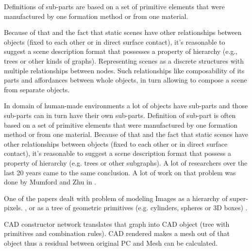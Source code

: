 Definitions of sub-parts are based on a set of primitive elements that were manufactured by one formation method or from one material.

Because of that and the fact that static scenes have other relationships between objects (fixed to each other or in direct surface contact), it's reasonable to suggest a scene description format that possesses a property of hierarchy (e.g., trees or other kinds of graphs).
Representing scenes as a discrete structures with multiple relationships between nodes. Such relationships like composability of its parts and affordances between whole objects, in turn allowing to compose a scene from separate objects.


In domain of human-made environments a lot of objects have sub-parts and those sub-parts can in turn have their own sub-parts. Definition of sub-part is often based on a set of primitive elements that were manufactured by one formation method or from one material. Because of that and the fact that static scenes have other relationships between objects (fixed to each other or in direct surface contact), it's reasonable to suggest a scene description format that possess a property of hierarchy (e.g. trees or other subgraphs).
A lot of researchers over the last 20 years came to the same conclusion. A lot of work on that problem was done by Mumford and Zhu in \cite{zhu2006stochastic}.

One of the papers dealt with problem of modeling Images as a hierarchy of super-pixels. \cite{russell2009associative}, or as a tree of geometric primitives (e.g. cylinders, spheres or 3D boxes) \cite{li2017grass}.




CAD constructor network translates that graph into CAD object (tree with primitives and combination rules). CAD rendered makes a mesh out of that object thus a residual between original PC and Mesh can be calculated.

